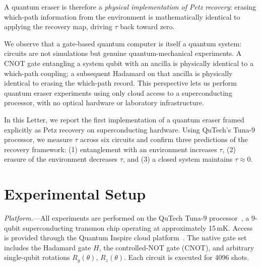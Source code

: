 \documentclass[prl,twocolumn,superscriptaddress,longbibliography,floatfix]{revtex4-2}
\newcommand{\tauasym}{\tau}
\begin{document}
A quantum eraser is therefore a \emph{physical implementation of Petz
recovery}: erasing which-path information from the environment is
mathematically identical to applying the recovery map, driving
$\tauasym$ back toward zero.

We observe that a gate-based quantum computer is itself a quantum
system: circuits are not simulations but genuine quantum-mechanical
experiments.  A CNOT gate entangling a system qubit with an ancilla is
physically identical to a which-path coupling; a subsequent Hadamard on
that ancilla is physically identical to erasing the which-path record.
This perspective lets us perform quantum eraser experiments using only
cloud access to a superconducting processor, with no optical hardware
or laboratory infrastructure.

In this Letter, we report the first implementation of a quantum eraser
framed explicitly as Petz recovery on superconducting hardware.
Using QuTech's Tuna-9 processor, we measure $\tauasym$ across six
circuits and confirm three predictions of the recovery framework:
(1) entanglement with an environment increases $\tauasym$,
(2) erasure of the environment decreases $\tauasym$, and
(3) a closed system maintains $\tauasym \approx 0$.

\section{Experimental Setup}

\textit{Platform.}---All experiments are performed on the QuTech
Tuna-9 processor~\cite{Tuna9}, a 9-qubit superconducting transmon
chip operating at approximately 15\,mK.  Access is provided through
the Quantum Inspire cloud platform~\cite{QI2022}.  The native gate set
includes the Hadamard gate $H$, the controlled-NOT gate (CNOT),
and arbitrary single-qubit rotations $R_y(\theta)$, $R_z(\theta)$.
Each circuit is executed for 4096 shots.
\end{document}
